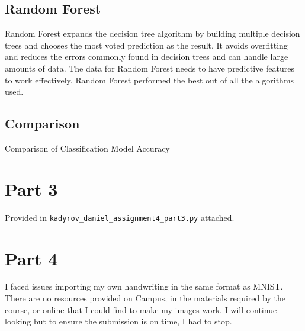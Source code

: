 \documentclass{homework}
\begin{document}
\subsection{Random Forest}

Random Forest expands the decision tree algorithm by building multiple decision trees and chooses the most voted prediction as the result. It avoids overfitting and reduces the errors commonly found in decision trees and can handle large amounts of data. The data for Random Forest needs to have predictive features to work effectively. Random Forest performed the best out of all the algorithms used.

\subsection{Comparison}

\begin{table}[h]
    \caption{Comparison of Classification Model Accuracy}
    \label{Comparison}
    \centering
    
\end{table}

\section{Part 3}

Provided in \texttt{kadyrov\_daniel\_assignment4\_part3.py} attached.

\section{Part 4}

I faced issues importing my own handwriting in the same format as MNIST. There are no resources provided on Campus, in the materials required by the course, or online that I could find to make my images work. I will continue looking but to ensure the submission is on time, I had to stop. 
\end{document}
